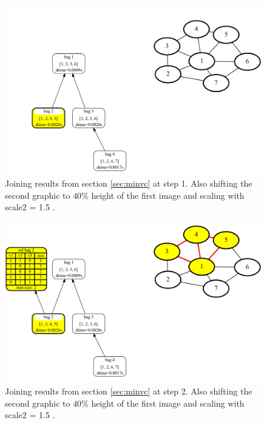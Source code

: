 \documentclass[a4paper, 12pt, bibliography=totoc]{scrartcl}
\begin{document}
\begin{figure}
	\centering
	\includegraphics[width=0.9\linewidth,height=0.9\textheight,keepaspectratio]{images/SVGJOIN/default_06sc151.pdf}
	\caption{Joining results from section \ref{sec:minvc} at step 1. Also shifting the second graphic to $40\%$ height of the first image and scaling with scale2 = 1.5 .}
	\label{fig:joinscaled1}
\end{figure}
\begin{figure}
	\centering
	\includegraphics[width=0.9\linewidth,height=0.9\textheight,keepaspectratio]{images/SVGJOIN/default_06sc152.pdf}
	\caption{Joining results from section \ref{sec:minvc} at step 2. Also shifting the second graphic to $40\%$ height of the first image and scaling with scale2 = 1.5 .}
	\label{fig:joinscaled2}
\end{figure}
\end{document}
